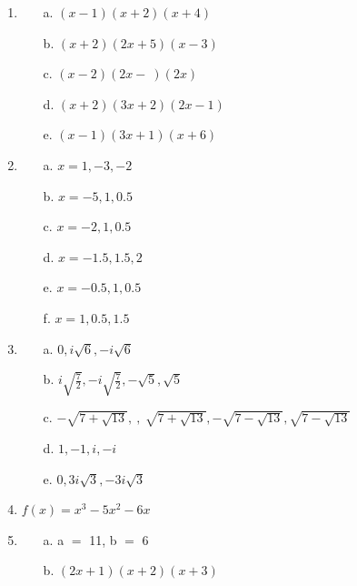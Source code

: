 \begin{enumerate}
\begin{enumerate}
\end{enumerate}
\item
\begin{enumerate}
  \item[a.] $(x - 1)(x + 2)(x + 4)$
  \item[b.] $(x + 2)(2x + 5)(x - 3)$
  \item[c.] $(x - 2)(2x -\ )(2x)$
  \item[d.] $(x + 2)(3x + 2)(2x - 1)$
  \item[e.] $(x - 1)(3x + 1)(x + 6)$
\end{enumerate}
\item
\begin{enumerate}
  \item[a.] $x = 1, -3, -2$
  \item[b.] $x = -5, 1, 0.5$
  \item[c.] $x = -2, 1, 0.5$
  \item[d.] $x = -1.5, 1.5, 2$
  \item[e.] $x = -0.5, 1, 0.5$
  \item[f.] $x = 1, 0.5, 1.5$
\end{enumerate}
\item
\begin{enumerate}
  \item[a.] $0, i\sqrt{6}, -i\sqrt{6}$
  \item[b.] $i\sqrt{\frac{7}{2}}, -i\sqrt{\frac{7}{2}}, -\sqrt{5}, \sqrt{5}$
  \item[c.] $-\sqrt{7 + \sqrt{13}},\ ,\ \sqrt{7 + \sqrt{13}}, -\sqrt{7 - \sqrt{13}},
  \sqrt{7 - \sqrt{13}}$
  \item[d.] $1, -1, i, -i$
  \item[e.] $0, 3i\sqrt{3}, -3i\sqrt{3}$
\end{enumerate}
\item $f(x) = x^3 - 5x^2 - 6x$
\item
\begin{enumerate}
  \item[a.] a $=$ 11, b $=$ 6
  \item[b.] $(2x + 1)(x + 2)(x + 3)$
\end{enumerate}
\end{enumerate}
